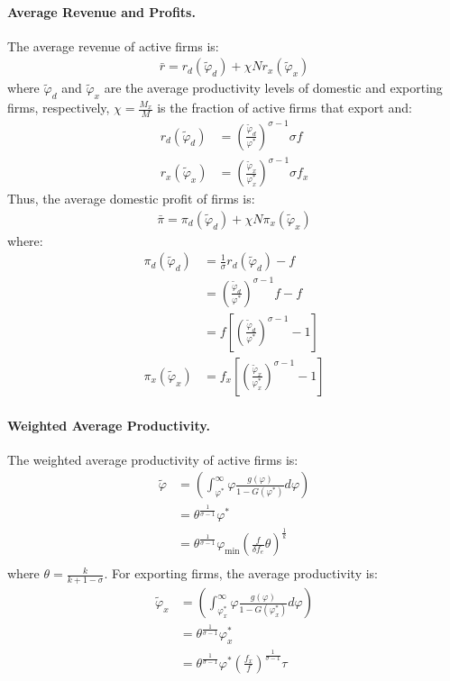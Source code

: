 \begin{solution}
	\paragraph{Average Revenue and Profits.} The average revenue of active firms is:
	\begin{align*}
		\bar{r} = r_d(\tilde{\varphi}_d) + \chi N r_x(\tilde{\varphi}_x)
	\end{align*}
	where $\tilde{\varphi}_d$ and $\tilde{\varphi}_x$ are the average productivity levels of domestic and exporting firms, respectively,  $\chi = \frac{M_x}{M}$ is the fraction of active firms that export and:
	\begin{align*}
		r_d(\tilde{\varphi}_d) &= \left(\frac{\tilde{\varphi}_d}{\varphi^*}\right)^{\sigma - 1} \sigma f \\
		r_x(\tilde{\varphi}_x) &= \left(\frac{\tilde{\varphi}_x}{\varphi_x^*}\right)^{\sigma - 1} \sigma f_x
	\end{align*}
	Thus, the average domestic profit of firms is:
	\begin{align*}
		\bar{\pi} = \pi_d(\tilde{\varphi}_d) + \chi N \pi_x(\tilde{\varphi}_x)
	\end{align*}
	where:
	\begin{align*}
		\pi_d(\tilde{\varphi}_d) &= \frac{1}{\sigma} r_d(\tilde{\varphi}_d) - f \\
		&= \left(\frac{\tilde{\varphi}_d}{\varphi^*}\right)^{\sigma - 1} f - f \\
		&= f \left[ \left(\frac{\tilde{\varphi}_d}{\varphi^*}\right)^{\sigma - 1} - 1 \right] \\
		\pi_x(\tilde{\varphi}_x) &= f_x \left[ \left(\frac{\tilde{\varphi}_x}{\varphi_x^*}\right)^{\sigma - 1} - 1 \right]
	\end{align*}

	\paragraph{Weighted Average Productivity.} The weighted average productivity of active firms is:
	\begin{align*}
		\tilde{\varphi} &= \left(\int_{\varphi^*}^{\infty} \varphi \frac{g(\varphi)}{1 - G(\varphi^*)} d\varphi \right) \\
		&= \theta^{\frac{1}{\sigma -1}} \varphi^* \\
		&= \theta^{\frac{1}{\sigma -1}} \varphi_{\min} \left( \frac{f}{\delta f_e} \theta \right)^{\frac{1}{k}} \\
	\end{align*}
	where $\theta = \frac{k}{k+1 - \sigma}$. For exporting firms, the average productivity is:
	\begin{align*}
		\tilde{\varphi}_x &= \left(\int_{\varphi_x^*}^{\infty} \varphi \frac{g(\varphi)}{1 - G(\varphi_x^*)} d\varphi \right) \\
		&= \theta^{\frac{1}{\sigma -1}} \varphi_x^* \\
		&= \theta^{\frac{1}{\sigma -1}} \varphi^* \left( \frac{f_x}{f} \right)^{\frac{1}{\sigma - 1}} \tau \\
	\end{align*}
	\end{solution}